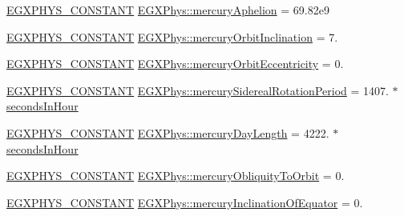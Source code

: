\begin{DoxyCompactItemize}
\item 
\mbox{\hyperlink{group___e_g_x_phys-_constants-_macros_ga76980d288494ce1714c9ac68a95ba702}{E\+G\+X\+P\+H\+Y\+S\+\_\+\+C\+O\+N\+S\+T\+A\+NT}} \mbox{\hyperlink{group___e_g_x_phys-_constants-_astrophysics-_solar_system-_mercury-_orbit_gaffbe46a6fa3661973f7bb52ec3f55200}{E\+G\+X\+Phys\+::mercury\+Aphelion}} = 69.\+82e9
\item 
\mbox{\hyperlink{group___e_g_x_phys-_constants-_macros_ga76980d288494ce1714c9ac68a95ba702}{E\+G\+X\+P\+H\+Y\+S\+\_\+\+C\+O\+N\+S\+T\+A\+NT}} \mbox{\hyperlink{group___e_g_x_phys-_constants-_astrophysics-_solar_system-_mercury-_orbit_ga58319d10bf99a7f9e02d58440f1e5e91}{E\+G\+X\+Phys\+::mercury\+Orbit\+Inclination}} = 7.
\item 
\mbox{\hyperlink{group___e_g_x_phys-_constants-_macros_ga76980d288494ce1714c9ac68a95ba702}{E\+G\+X\+P\+H\+Y\+S\+\_\+\+C\+O\+N\+S\+T\+A\+NT}} \mbox{\hyperlink{group___e_g_x_phys-_constants-_astrophysics-_solar_system-_mercury-_orbit_gab6a88c67a02add73a0acd9c46b05d9bb}{E\+G\+X\+Phys\+::mercury\+Orbit\+Eccentricity}} = 0.
\item 
\mbox{\hyperlink{group___e_g_x_phys-_constants-_macros_ga76980d288494ce1714c9ac68a95ba702}{E\+G\+X\+P\+H\+Y\+S\+\_\+\+C\+O\+N\+S\+T\+A\+NT}} \mbox{\hyperlink{group___e_g_x_phys-_constants-_astrophysics-_solar_system-_mercury-_orbit_ga5908bc1ce452d68e135a79df00e7b242}{E\+G\+X\+Phys\+::mercury\+Sidereal\+Rotation\+Period}} = 1407. $\ast$ \mbox{\hyperlink{namespace_e_g_x_phys_a7c3165cd93e36f1fb8e9fef80f117bef}{seconds\+In\+Hour}}
\item 
\mbox{\hyperlink{group___e_g_x_phys-_constants-_macros_ga76980d288494ce1714c9ac68a95ba702}{E\+G\+X\+P\+H\+Y\+S\+\_\+\+C\+O\+N\+S\+T\+A\+NT}} \mbox{\hyperlink{group___e_g_x_phys-_constants-_astrophysics-_solar_system-_mercury-_orbit_ga76e5523953ddab271845bbaf597fc16c}{E\+G\+X\+Phys\+::mercury\+Day\+Length}} = 4222. $\ast$ \mbox{\hyperlink{namespace_e_g_x_phys_a7c3165cd93e36f1fb8e9fef80f117bef}{seconds\+In\+Hour}}
\item 
\mbox{\hyperlink{group___e_g_x_phys-_constants-_macros_ga76980d288494ce1714c9ac68a95ba702}{E\+G\+X\+P\+H\+Y\+S\+\_\+\+C\+O\+N\+S\+T\+A\+NT}} \mbox{\hyperlink{group___e_g_x_phys-_constants-_astrophysics-_solar_system-_mercury-_orbit_ga9eab31e7775425e9d213174b91d7cb7e}{E\+G\+X\+Phys\+::mercury\+Obliquity\+To\+Orbit}} = 0.
\item 
\mbox{\hyperlink{group___e_g_x_phys-_constants-_macros_ga76980d288494ce1714c9ac68a95ba702}{E\+G\+X\+P\+H\+Y\+S\+\_\+\+C\+O\+N\+S\+T\+A\+NT}} \mbox{\hyperlink{group___e_g_x_phys-_constants-_astrophysics-_solar_system-_mercury-_orbit_ga691d47f9e6155fde39610f722c2c81b3}{E\+G\+X\+Phys\+::mercury\+Inclination\+Of\+Equator}} = 0.
\end{DoxyCompactItemize}


